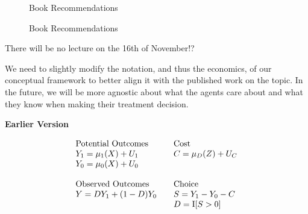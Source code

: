 \begin{frame}
\begin{figure}
\caption{Book Recommendations}
\hspace{0.5cm}
\end{figure}
\end{frame}


\begin{frame}
\begin{figure}
\caption{Book Recommendations}
\hspace{0.5cm}
\end{figure}
\end{frame}


\begin{frame}\centering
There will be no lecture on the 16th of November!?
\end{frame}



\begin{frame}
We need to slightly modify the notation, and thus the economics, of our conceptual framework to better align it with the published work on the topic. In the future, we will be more agnostic about what the agents care about and what they know when making their treatment decision.
\end{frame}

\begin{frame}
\textbf{Earlier Version}

\begin{align*}\begin{array}{l@{\qquad}l}
\text{Potential Outcomes} & \text{Cost} \\
Y_1 = \mu_1(X) + U_1      &C = \mu_D(Z) + U_C \\
Y_0 = \mu_0(X) + U_0      & \\
    & \\
\text{Observed Outcomes } & \text{Choice} \\
Y = D Y_1 + (1 - D)Y_0 & S = Y_1 - Y_0 - C \\
                       & D = \mathrm{I}[S > 0] \\
\end{array}\end{align*}
\end{frame}


